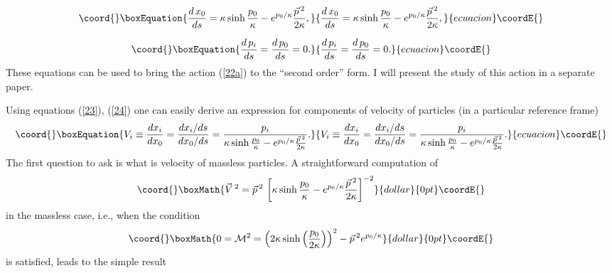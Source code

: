 \documentclass[a4paper,a4paper]{article}
\begin{document}
\begin{equation}\coord{}\boxEquation{\label{24}
 \frac{d\, x_0}{ds} = \kappa \sinh \frac{p_0}\kappa - e^{p_0/\kappa} \frac{\vec{p}\,{}^2}{2\kappa},
}{\frac{d\, x_0}{ds} = \kappa \sinh \frac{p_0}\kappa - e^{p_0/\kappa} \frac{\vec{p}\,{}^2}{2\kappa},
}{ecuacion}\coordE{}\end{equation}

\begin{equation}\coord{}\boxEquation{\label{25}
  \frac{d\, p_i}{ds} =\frac{d\, p_0}{ds} =0.
}{\frac{d\, p_i}{ds} =\frac{d\, p_0}{ds} =0.
}{ecuacion}\coordE{}\end{equation}
These equations can be used to bring the action (\ref{22a}) to the ``second order'' form. I will present the study of this action in a separate paper.

Using  equations (\ref{23}), (\ref{24}) one can easily derive an expression for components of velocity of particles (in a particular reference frame)
\begin{equation}\coord{}\boxEquation{\label{26}
 V_i \equiv \frac{dx_i}{dx_0} =  \frac{dx_i/ds}{dx_0/ds} = \frac{p_i}{\kappa \sinh \frac{p_0}\kappa - e^{p_0/\kappa} \frac{\vec{p}\,{}^2}{2\kappa}}.
}{V_i \equiv \frac{dx_i}{dx_0} =  \frac{dx_i/ds}{dx_0/ds} = \frac{p_i}{\kappa \sinh \frac{p_0}\kappa - e^{p_0/\kappa} \frac{\vec{p}\,{}^2}{2\kappa}}.
}{ecuacion}\coordE{}\end{equation}
 The first question to ask is what is velocity of massless particles. A straightforward computation of $$\coord{}\boxMath{\vec{V}\,{}^2 = \vec{p}\,{}^2\,\left[\kappa \sinh \frac{p_0}\kappa - e^{p_0/\kappa} \frac{\vec{p}\,{}^2}{2\kappa}\right]^{-2}}{dollar}{0pt}\coordE{}$$ in the massless case, i.e., when the condition $$\coord{}\boxMath{0={\cal M}^2 = \left(2\kappa \sinh\left(\frac{p_0}{2\kappa}\right)\right)^2 - \vec{p}\,{}^2 e^{p_0/\kappa}}{dollar}{0pt}\coordE{}$$ is satisfied, leads to the simple result
\end{document}
